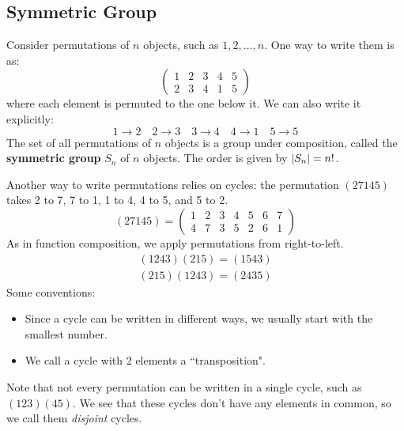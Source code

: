 \newpage
\subsection{Symmetric Group}
\begin{defn}
    Consider permutations of $ n $ objects, such as $ 1, 2, \dots, n $. \vsp
    One way to write them is as:
    \begin{equation*}
        \begin{pmatrix}
            1 & 2 & 3 & 4 & 5 \\ 2 & 3 & 4 & 1 & 5
        \end{pmatrix}
    \end{equation*}
    where each element is permuted to the one below it.
    We can also write it explicitly:
    \begin{equation*}
        1 \rightarrow 2 \quad 2 \rightarrow 3 \quad 3 \rightarrow 4 \quad 4 \rightarrow 1 \quad
        5 \rightarrow 5
    \end{equation*}
    The set of all permutations of $ n $ objects is a group under composition,
    called the \textbf{symmetric group} $ S_{n} $ of $ n $ objects.
    The order is given by $ \abs{S_{n}} = n! $.
\end{defn}
Another way to write permutations relies on cycles:
the permutation $ (27145) $ takes 2 to 7, 7 to 1, 1 to 4, 4 to 5, and 5 to 2.
\begin{equation*}
    (27145) =
    \begin{pmatrix}
        1 & 2 & 3 & 4 & 5 & 6 & 7 \\ 4 & 7 & 3 & 5 & 2 & 6 & 1
    \end{pmatrix}
\end{equation*}
As in function composition, we apply permutations from right-to-left.
\begin{gather*}
    (1243)(215) = (1543) \\
    (215)(1243) = (2435)
\end{gather*}
Some conventions:
\begin{itemize}
    \item Since a cycle can be written in different ways, we usually start with the smallest number.
    \item We call a cycle with 2 elements a ``transposition".
\end{itemize}
Note that not every permutation can be written in a single cycle, such as $ (123)(45) $.
We see that these cycles don't have any elements in common, so we call them \textit{disjoint}
cycles.

